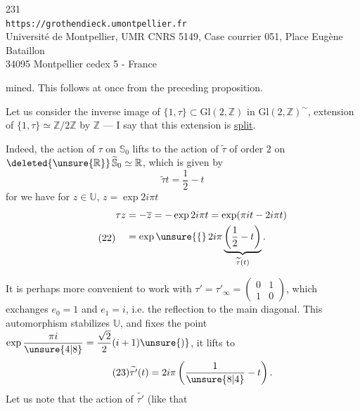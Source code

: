
\begin{center}
231\\
\texttt{https://grothendieck.umontpellier.fr}\\
Université de Montpellier, UMR CNRS 5149, Case courrier 051, Place Eugène Bataillon\\
34095 Montpellier cedex 5 - France
\end{center}


mined. This follows 
at once from the preceding proposition.

 Let us consider the inverse image of $\{1,\tau\}\subset\mathrm{Gl}(2,\mathbb Z)$
in $\mathrm{Gl}(2,\mathbb Z)^{\sim}$,
 extension of
$\{1,\tau\}\simeq\mathbb Z/2\mathbb Z$ by $\mathbb Z$
--- I say that this extension is \uline{split}.


Indeed, the action of $\tau$ on $\mathbb S_0$
lifts to the action of $\widetilde\tau$ 
of order $2$ on
$\deleted{\unsure{\mathbb R}}\,
\widetilde{\mathbb S}_0\simeq\mathbb R$,
which is given by
\[
\tag{21}
\widetilde\tau t=\frac12-t
\]
for we have for $z\in\mathbb U$, $z=\exp 2i\pi t$
\[
\tag{22}
\begin{aligned}
\tau z&=-\overline z=-\exp 2i\pi t
=\exp(\pi it-2i\pi t)\\
&=\exp\unsure{\{}\,2i\pi
\underbrace{\left(\frac12-t\right)}_{\widetilde\tau(t)}.
\end{aligned}
\]

 It is perhaps more convenient to work with
$\tau'=\tau'_\infty=\begin{pmatrix}0&1\\1&0\end{pmatrix}$,
which  exchanges $e_0=1$ and $e_1=i$,
i.e. the reflection  to the main diagonal.
This automorphism stabilizes $\mathbb U$, and fixes the point
$\exp\dfrac{\pi i}{\unsure{4|8}}=\dfrac{\sqrt2}{2}(i+1)\unsure{)}$,
it lifts to
\[
\tag{23}
\widetilde{\tau'}(t)=2i\pi\left(\frac1{\unsure{8|4}}-t\right).
\]
Let us note that 
the action of $\widetilde{\tau'}$ (like that


